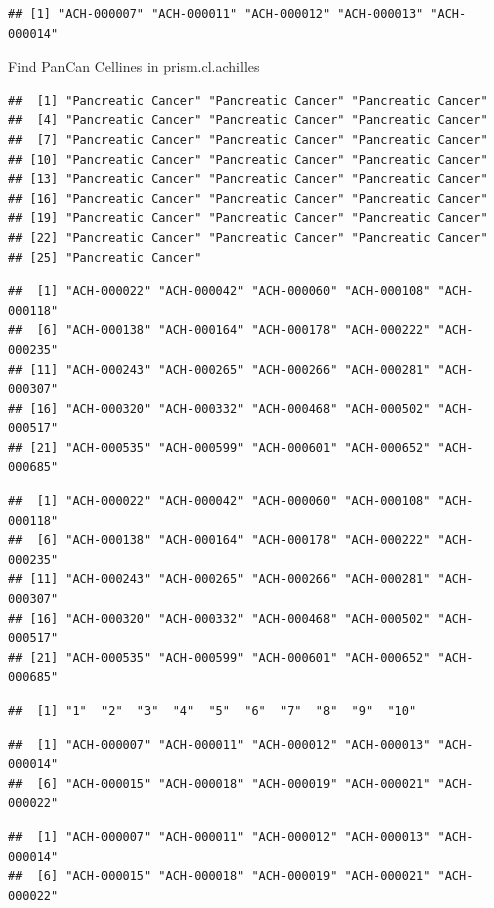 \documentclass[
]{article}
\begin{document}
\begin{verbatim}
## [1] "ACH-000007" "ACH-000011" "ACH-000012" "ACH-000013" "ACH-000014"
\end{verbatim}

Find PanCan Cellines in prism.cl.achilles

\begin{verbatim}
##  [1] "Pancreatic Cancer" "Pancreatic Cancer" "Pancreatic Cancer"
##  [4] "Pancreatic Cancer" "Pancreatic Cancer" "Pancreatic Cancer"
##  [7] "Pancreatic Cancer" "Pancreatic Cancer" "Pancreatic Cancer"
## [10] "Pancreatic Cancer" "Pancreatic Cancer" "Pancreatic Cancer"
## [13] "Pancreatic Cancer" "Pancreatic Cancer" "Pancreatic Cancer"
## [16] "Pancreatic Cancer" "Pancreatic Cancer" "Pancreatic Cancer"
## [19] "Pancreatic Cancer" "Pancreatic Cancer" "Pancreatic Cancer"
## [22] "Pancreatic Cancer" "Pancreatic Cancer" "Pancreatic Cancer"
## [25] "Pancreatic Cancer"
\end{verbatim}

\begin{verbatim}
##  [1] "ACH-000022" "ACH-000042" "ACH-000060" "ACH-000108" "ACH-000118"
##  [6] "ACH-000138" "ACH-000164" "ACH-000178" "ACH-000222" "ACH-000235"
## [11] "ACH-000243" "ACH-000265" "ACH-000266" "ACH-000281" "ACH-000307"
## [16] "ACH-000320" "ACH-000332" "ACH-000468" "ACH-000502" "ACH-000517"
## [21] "ACH-000535" "ACH-000599" "ACH-000601" "ACH-000652" "ACH-000685"
\end{verbatim}

\begin{verbatim}
##  [1] "ACH-000022" "ACH-000042" "ACH-000060" "ACH-000108" "ACH-000118"
##  [6] "ACH-000138" "ACH-000164" "ACH-000178" "ACH-000222" "ACH-000235"
## [11] "ACH-000243" "ACH-000265" "ACH-000266" "ACH-000281" "ACH-000307"
## [16] "ACH-000320" "ACH-000332" "ACH-000468" "ACH-000502" "ACH-000517"
## [21] "ACH-000535" "ACH-000599" "ACH-000601" "ACH-000652" "ACH-000685"
\end{verbatim}

\begin{verbatim}
##  [1] "1"  "2"  "3"  "4"  "5"  "6"  "7"  "8"  "9"  "10"
\end{verbatim}

\begin{verbatim}
##  [1] "ACH-000007" "ACH-000011" "ACH-000012" "ACH-000013" "ACH-000014"
##  [6] "ACH-000015" "ACH-000018" "ACH-000019" "ACH-000021" "ACH-000022"
\end{verbatim}

\begin{verbatim}
##  [1] "ACH-000007" "ACH-000011" "ACH-000012" "ACH-000013" "ACH-000014"
##  [6] "ACH-000015" "ACH-000018" "ACH-000019" "ACH-000021" "ACH-000022"
\end{verbatim}
\end{document}

